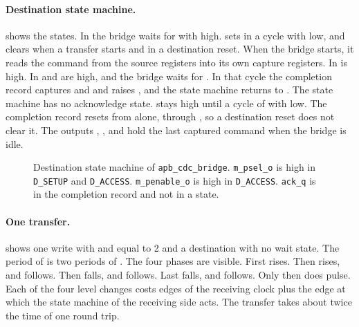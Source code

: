 \paragraph{Destination state machine.}  shows the states. In  the bridge waits for  with  high.  sets in a cycle with  low, and clears when a transfer starts and in a destination reset. When the bridge starts, it reads the command from the source registers into its own capture registers. In   is high. In   and  are high, and the bridge waits for . In that cycle the completion record captures  and  and raises , and the state machine returns to . The state machine has no acknowledge state.  stays high until a cycle of  with  low. The completion record resets from  alone, through , so a destination reset does not clear it. The outputs , ,  and  hold the last captured command when the bridge is idle.

\begin{figure}[ht]
  \centering
  \caption{Destination state machine of \texttt{apb\_cdc\_bridge}. \texttt{m\_psel\_o} is high in \texttt{D\_SETUP} and \texttt{D\_ACCESS}. \texttt{m\_penable\_o} is high in \texttt{D\_ACCESS}. \texttt{ack\_q} is in the completion record and not in a state.}\label{fig:tm:mod:apb-cdc-bridge:dfsm}
\end{figure}

\paragraph{One transfer.}  shows one write with  and  equal to 2 and a destination with no wait state. The period of  is two periods of . The four phases are visible. First  rises. Then  rises, and  follows. Then  falls, and  follows. Last  falls, and  follows. Only then does  pulse. Each of the four level changes costs  edges of the receiving clock plus the edge at which the state machine of the receiving side acts. The transfer takes about twice the time of one round trip.

